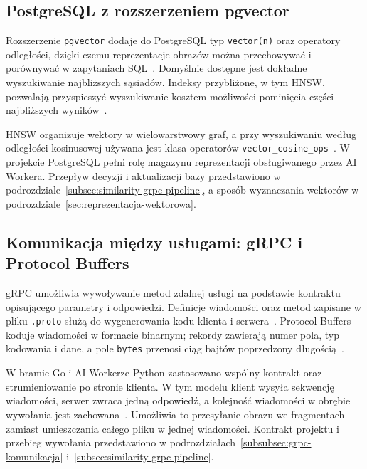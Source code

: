 \subsection{PostgreSQL z rozszerzeniem pgvector}
\label{subsec:tech-pgvector}

Rozszerzenie \texttt{pgvector} dodaje do PostgreSQL typ \texttt{vector(n)} oraz operatory odległości, dzięki czemu reprezentacje obrazów można przechowywać i porównywać w zapytaniach SQL~\cite{pgvector_docs}. Domyślnie dostępne jest dokładne wyszukiwanie najbliższych sąsiadów. Indeksy przybliżone, w tym HNSW, pozwalają przyspieszyć wyszukiwanie kosztem możliwości pominięcia części najbliższych wyników~\cite{pgvector_docs}.

HNSW organizuje wektory w wielowarstwowy graf, a przy wyszukiwaniu według odległości kosinusowej używana jest klasa operatorów \texttt{vector\_cosine\_ops}~\cite{pgvector_docs}. W projekcie PostgreSQL pełni rolę magazynu reprezentacji obsługiwanego przez AI Workera. Przepływ decyzji i aktualizacji bazy przedstawiono w podrozdziale~\ref{subsec:similarity-grpc-pipeline}, a sposób wyznaczania wektorów w podrozdziale~\ref{sec:reprezentacja-wektorowa}.

\subsection{Komunikacja między usługami: gRPC i Protocol Buffers}
\label{subsec:tech-grpc-protobuf}

gRPC umożliwia wywoływanie metod zdalnej usługi na podstawie kontraktu opisującego parametry i odpowiedzi. Definicje wiadomości oraz metod zapisane w pliku \texttt{.proto} służą do wygenerowania kodu klienta i serwera~\cite{grpc_core_concepts}. Protocol Buffers koduje wiadomości w formacie binarnym; rekordy zawierają numer pola, typ kodowania i dane, a pole \texttt{bytes} przenosi ciąg bajtów poprzedzony długością~\cite{protobuf_encoding}.

W bramie Go i AI Workerze Python zastosowano wspólny kontrakt oraz strumieniowanie po stronie klienta. W tym modelu klient wysyła sekwencję wiadomości, serwer zwraca jedną odpowiedź, a kolejność wiadomości w obrębie wywołania jest zachowana~\cite{grpc_core_concepts}. Umożliwia to przesyłanie obrazu we fragmentach zamiast umieszczania całego pliku w jednej wiadomości. Kontrakt projektu i przebieg wywołania przedstawiono w podrozdziałach~\ref{subsubsec:grpc-komunikacja} i~\ref{subsec:similarity-grpc-pipeline}.
